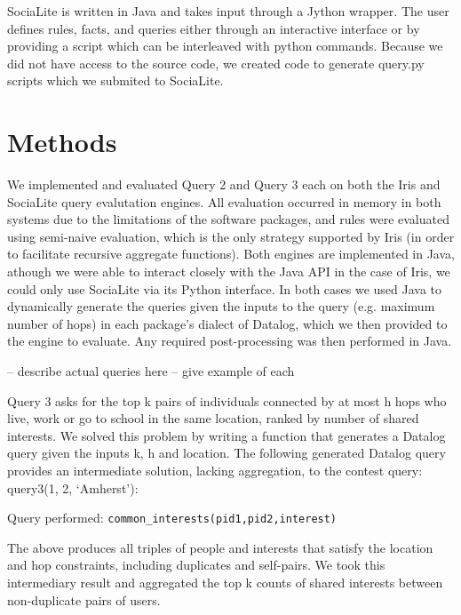 \documentclass{article}
\begin{document}
\begin{multicols}{2}
SociaLite is written in Java and takes input through a Jython wrapper. The user defines rules, facts, and queries either through an interactive interface or by providing a script which can be interleaved with python commands. Because we did not have access to the source code, we created code to generate query.py scripts which we submited to SociaLite. 


\section{Methods}

We implemented and evaluated Query 2 and Query 3 each on both the Iris and SociaLite query evalutation engines. All evaluation occurred in memory in both systems due to the limitations of the software packages, and rules were evaluated using semi-naive evaluation, which is the only strategy supported by Iris (in order to facilitate recursive aggregate functions). Both engines are implemented in Java, athough we were able to interact closely with the Java API in the case of Iris, we could only use SociaLite via its Python interface. In both cases we used Java to dynamically generate the queries given the inputs to the query (e.g. maximum number of hops) in each package's dialect of Datalog, which we then provided to the engine to evaluate. Any required post-processing was then performed in Java.

-- describe actual queries here
-- give example of each

Query 3 asks for the top k pairs of individuals connected by at most h hops who live, work or go to school in the same location, ranked by number of shared interests. We solved this problem by writing a function that generates a Datalog query given the inputs k, h and location. The following generated Datalog query provides an intermediate solution, lacking aggregation, to the contest query: query3(1, 2, ‘Amherst’):



Query performed: \texttt{common\_interests(pid1,pid2,interest)}

The above produces all triples of people and interests that satisfy the location and hop constraints, including duplicates and self-pairs. We took this intermediary result and aggregated the top k counts of shared interests between non-duplicate pairs of users.																																												

\end{multicols}
\end{document}
